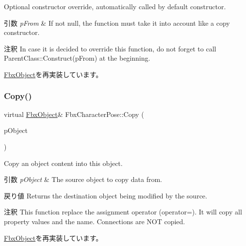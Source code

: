 Optional constructor override, automatically called by default constructor. 
\begin{DoxyParams}{引数}
{\em p\+From} & If not null, the function must take it into account like a copy constructor. \\
\hline
\end{DoxyParams}
\begin{DoxyRemark}{注釈}
In case it is decided to override this function, do not forget to call Parent\+Class\+::\+Construct(p\+From) at the beginning. 
\end{DoxyRemark}


\hyperlink{class_fbx_object_a313503bc645af3fdceb4a99ef5cea7eb}{Fbx\+Object}を再実装しています。

\mbox{\label{class_fbx_character_pose_a7d4ac33deebb7bbfef01f3b6ba3b3cff}} 
\subsubsection{\texorpdfstring{Copy()}{Copy()}}
{\footnotesize\ttfamily virtual \hyperlink{class_fbx_object}{Fbx\+Object}\& Fbx\+Character\+Pose\+::\+Copy (\begin{DoxyParamCaption}\item[{const \hyperlink{class_fbx_object}{Fbx\+Object} \&}]{p\+Object }\end{DoxyParamCaption})\hspace{0.3cm}{\ttfamily [virtual]}}

Copy an object content into this object. 
\begin{DoxyParams}{引数}
{\em p\+Object} & The source object to copy data from. \\
\hline
\end{DoxyParams}
\begin{DoxyReturn}{戻り値}
Returns the destination object being modified by the source. 
\end{DoxyReturn}
\begin{DoxyRemark}{注釈}
This function replace the assignment operator (operator=). It will copy all property values and the name. Connections are N\+OT copied. 
\end{DoxyRemark}


\hyperlink{class_fbx_object_a0c0c5adb38284d14bb82c04d54504a3e}{Fbx\+Object}を再実装しています。

